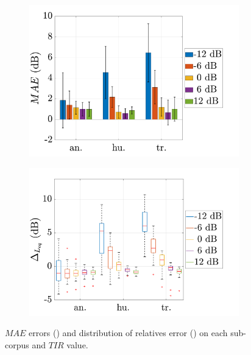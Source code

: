 \documentclass[12pt,english,twoside]{article}
\begin{document}
\begin{figure}
\centering
\begin{subfigure}{.5\textwidth}
  \centering
  \includegraphics[width=.9\linewidth]{figures/mae_ambiance_bar_ICSV.pdf}
  \caption{ }
  \label{fig:bar_mae}
\end{subfigure}%
\begin{subfigure}{.5\textwidth}
  \centering
  \includegraphics[width=.9\linewidth]{figures/boxplot_amb_nmf_thresholded.pdf}
  \caption{}
  \label{fig:boxplot}
\end{subfigure}
\caption{$MAE$ errors () and distribution of relatives error () on each sub-corpus and $TIR$ value.}
\label{fig:resultat_mae}
\end{figure}
\end{document}
